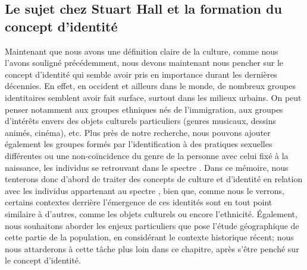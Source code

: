 \subsection{Le sujet chez Stuart Hall et la formation du concept d'identité}
\label{subsec:sujet_et_identité} Maintenant que nous avons une définition claire de la culture, comme nous l'avons souligné précédemment, nous devons maintenant nous pencher sur le concept d'identité qui semble avoir pris en importance durant les dernières décennies.
En effet, en occident et ailleurs dans le monde, de nombreux groupes identitaires semblent avoir fait surface, surtout dans les milieux urbains.
On peut penser notamment aux groupes ethniques nés de l'immigration, aux groupes d'intérêts envers des objets culturels particuliers (genres musicaux, dessins animés, cinéma), etc.
Plus près de notre recherche, nous pouvons ajouter également les groupes formés par l'identification à des pratiques sexuelles différentes ou une non-coïncidence du genre de la personne avec celui fixé à la naissance, les individus se retrouvant dans le spectre \lgbt{}.
Dans ce mémoire, nous tenterons donc d'abord de traiter des concepts de culture et d'identité en relation avec les individus appartenant au spectre \lgbt{}, bien que, comme nous le verrons, certains contextes derrière l'émergence de ces identités sont en tout point similaire à d'autres, comme les objets culturels ou encore l'ethnicité.
Également, nous souhaitons aborder les enjeux particuliers que pose l'étude géographique de cette partie de la population, en considérant le contexte historique récent; nous nous attarderons à cette tâche plus loin dans ce chapitre, après s'être penché sur le concept d'identité.


